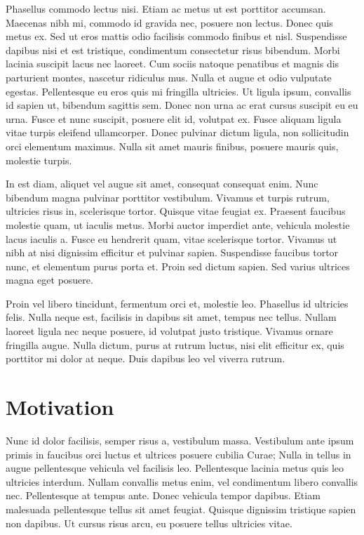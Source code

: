 \documentclass{sig-alternate}
\begin{document}
Phasellus commodo lectus nisi. Etiam ac metus ut est porttitor accumsan. Maecenas nibh mi, commodo id gravida nec, posuere non lectus. Donec quis metus ex. Sed ut eros mattis odio facilisis commodo finibus et nisl. Suspendisse dapibus nisi et est tristique, condimentum consectetur risus bibendum. Morbi lacinia suscipit lacus nec laoreet. Cum sociis natoque penatibus et magnis dis parturient montes, nascetur ridiculus mus. Nulla et augue et odio vulputate egestas. Pellentesque eu eros quis mi fringilla ultricies. Ut ligula ipsum, convallis id sapien ut, bibendum sagittis sem. Donec non urna ac erat cursus suscipit eu eu urna. Fusce et nunc suscipit, posuere elit id, volutpat ex. Fusce aliquam ligula vitae turpis eleifend ullamcorper. Donec pulvinar dictum ligula, non sollicitudin orci elementum maximus. Nulla sit amet mauris finibus, posuere mauris quis, molestie turpis.

In est diam, aliquet vel augue sit amet, consequat consequat enim. Nunc bibendum magna pulvinar porttitor vestibulum. Vivamus et turpis rutrum, ultricies risus in, scelerisque tortor. Quisque vitae feugiat ex. Praesent faucibus molestie quam, ut iaculis metus. Morbi auctor imperdiet ante, vehicula molestie lacus iaculis a. Fusce eu hendrerit quam, vitae scelerisque tortor. Vivamus ut nibh at nisi dignissim efficitur et pulvinar sapien. Suspendisse faucibus tortor nunc, et elementum purus porta et. Proin sed dictum sapien. Sed varius ultrices magna eget posuere.

Proin vel libero tincidunt, fermentum orci et, molestie leo. Phasellus id ultricies felis. Nulla neque est, facilisis in dapibus sit amet, tempus nec tellus. Nullam laoreet ligula nec neque posuere, id volutpat justo tristique. Vivamus ornare fringilla augue. Nulla dictum, purus at rutrum luctus, nisi elit efficitur ex, quis porttitor mi dolor at neque. Duis dapibus leo vel viverra rutrum.


\section{Motivation}
Nunc id dolor facilisis, semper risus a, vestibulum massa. Vestibulum ante ipsum primis in faucibus orci luctus et ultrices posuere cubilia Curae; Nulla in tellus in augue pellentesque vehicula vel facilisis leo. Pellentesque lacinia metus quis leo ultricies interdum. Nullam convallis metus enim, vel condimentum libero convallis nec. Pellentesque at tempus ante. Donec vehicula tempor dapibus. Etiam malesuada pellentesque tellus sit amet feugiat. Quisque dignissim tristique sapien non dapibus. Ut cursus risus arcu, eu posuere tellus ultricies vitae.
\end{document}
